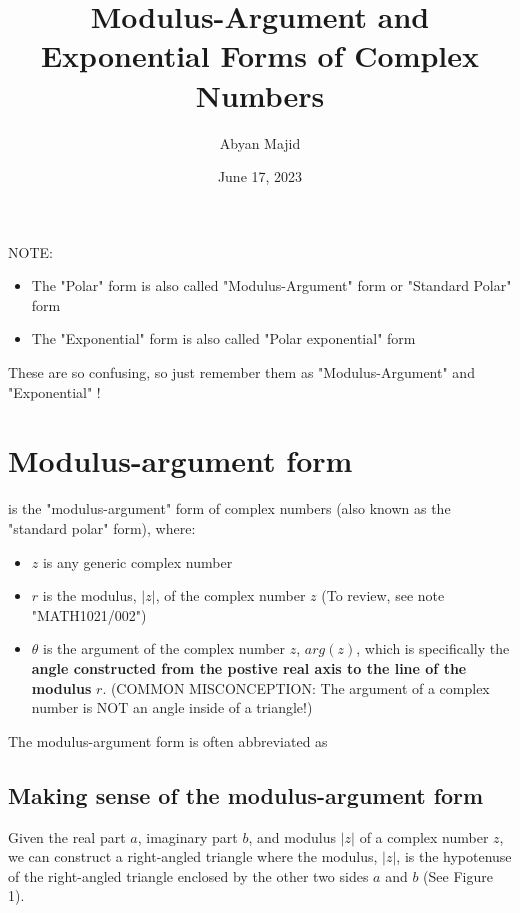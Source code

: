 \documentclass{article}
\begin{document}
\title{Modulus-Argument and Exponential Forms of Complex Numbers}
\author{Abyan Majid}
\date{June 17, 2023}
\maketitle

NOTE:
\begin{itemize}
    \item The "Polar" form is also called "Modulus-Argument" form or "Standard Polar" form
    \item The "Exponential" form is also called "Polar exponential" form
\end{itemize}

These are so confusing, so just remember them as "Modulus-Argument" and "Exponential" !

\section{Modulus-argument form}

 is the "modulus-argument" form of complex numbers (also known as the "standard polar" form), where:

\begin{itemize}
    \item $z$ is any generic complex number
    \item $r$ is the modulus, $|z|$, of the complex number $z$ (To review, see note "MATH1021/002")
    \item $\theta$ is the argument of the complex number $z$, $arg(z)$, which is specifically the \textbf{angle constructed from the postive real axis to the line of the modulus} $r$. (COMMON MISCONCEPTION: The argument of a complex number is NOT an angle inside of a triangle!)
\end{itemize}

The modulus-argument form is often abbreviated as 

\subsection{Making sense of the modulus-argument form}

Given the real part $a$, imaginary part $b$, and modulus $|z|$ of a complex number $z$, we can construct a right-angled triangle where the modulus, $|z|$, is the hypotenuse of the right-angled triangle enclosed by the other two sides $a$ and $b$ (See Figure 1).
\end{document}
